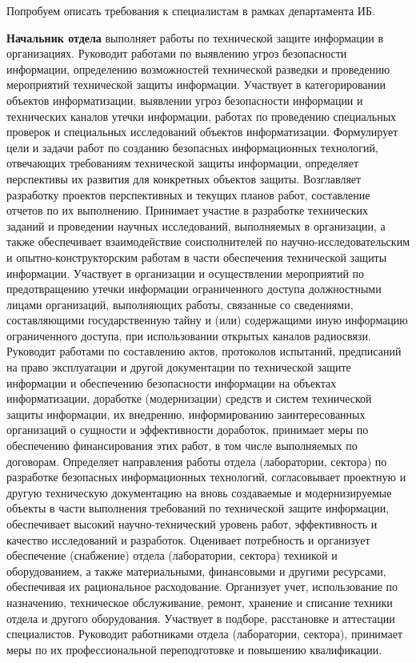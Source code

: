 Попробуем описать требования к специалистам в рамках департамента ИБ.

\textbf{Начальник отдела} выполняет работы по технической защите информации в организациях. Руководит работами по выявлению угроз безопасности информации, определению возможностей технической разведки и проведению мероприятий технической защиты информации. Участвует в категорировании объектов информатизации, выявлении угроз безопасности информации и технических каналов утечки информации, работах по проведению специальных проверок и специальных исследований объектов информатизации. Формулирует цели и задачи работ по созданию безопасных информационных технологий, отвечающих требованиям технической защиты информации, определяет перспективы их развития для конкретных объектов защиты. Возглавляет разработку проектов перспективных и текущих планов работ, составление отчетов по их выполнению. Принимает участие в разработке технических заданий и проведении научных исследований, выполняемых в организации, а также обеспечивает взаимодействие соисполнителей по научно-исследовательским и опытно-конструкторским работам в части обеспечения технической защиты информации. Участвует в организации и осуществлении мероприятий по предотвращению утечки информации ограниченного доступа должностными лицами организаций, выполняющих работы, связанные со сведениями, составляющими государственную тайну и (или) содержащими иную информацию ограниченного доступа, при использовании открытых каналов радиосвязи. Руководит работами по составлению актов, протоколов испытаний, предписаний на право эксплуатации и другой документации по технической защите информации и обеспечению безопасности информации на объектах информатизации, доработке (модернизации) средств и систем технической защиты информации, их внедрению, информированию заинтересованных организаций о сущности и эффективности доработок, принимает меры по обеспечению финансирования этих работ, в том числе выполняемых по договорам. Определяет направления работы отдела (лаборатории, сектора) по разработке безопасных информационных технологий, согласовывает проектную и другую техническую документацию на вновь создаваемые и модернизируемые объекты в части выполнения требований по технической защите информации, обеспечивает высокий научно-технический уровень работ, эффективность и качество исследований и разработок. Оценивает потребность и организует обеспечение (снабжение) отдела (лаборатории, сектора) техникой и оборудованием, а также материальными, финансовыми и другими ресурсами, обеспечивая их рациональное расходование. Организует учет, использование по назначению, техническое обслуживание, ремонт, хранение и списание техники отдела и другого оборудования. Участвует в подборе, расстановке и аттестации специалистов. Руководит работниками отдела (лаборатории, сектора), принимает меры по их профессиональной переподготовке и повышению квалификации.

